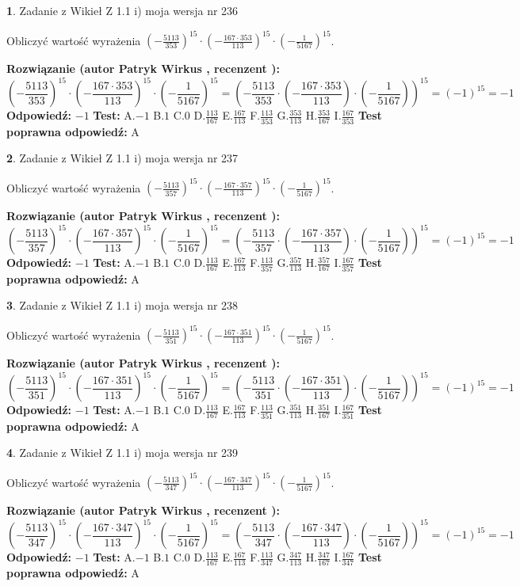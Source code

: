 \documentclass[12pt, a4paper]{article}
\theoremstyle{definition} %
\newtheorem{zad}{}
\newcommand{\zadStart}[1]{\begin{zad}#1\newline}
\newcommand{\zadStop}{\end{zad}}
\newcommand{\rozwStart}[2]{\noindent \textbf{Rozwiązanie (autor #1 , recenzent #2): }\newline}
\newcommand{\rozwStop}{\newline}
\newcommand{\odpStart}{\noindent \textbf{Odpowiedź:}\newline}
\newcommand{\odpStop}{\newline}
\newcommand{\testStart}{\noindent \textbf{Test:}\newline}
\newcommand{\testStop}{\newline}
\newcommand{\kluczStart}{\noindent \textbf{Test poprawna odpowiedź:}\newline}
\newcommand{\kluczStop}{\newline}
\begin{document}
\zadStart{Zadanie z Wikieł Z 1.1 i) moja wersja nr 236}

Obliczyć wartość wyrażenia $(-\frac{5113}{353})^{15} \cdot (-\frac{167 \cdot 353}{113})^{15} \cdot (-\frac{1}{5167})^{15}$.
\zadStop
\rozwStart{Patryk Wirkus}{}
$$(-\frac{5113}{353})^{15} \cdot (-\frac{167 \cdot 353}{113})^{15} \cdot (-\frac{1}{5167})^{15} = (-\frac{5113}{353} \cdot (-\frac{167 \cdot 353}{113}) \cdot (-\frac{1}{5167}))^{15} = (-1)^{15} = -1$$
\rozwStop
\odpStart
$-1$
\odpStop
\testStart
A.$-1$ B.$1$ C.$0$ D.$\frac{113}{167}$ E.$\frac{167}{113}$
F.$\frac{113}{353}$ G.$\frac{353}{113}$
H.$\frac{353}{167}$
I.$\frac{167}{353}$
\testStop
\kluczStart
A
\kluczStop



\zadStart{Zadanie z Wikieł Z 1.1 i) moja wersja nr 237}

Obliczyć wartość wyrażenia $(-\frac{5113}{357})^{15} \cdot (-\frac{167 \cdot 357}{113})^{15} \cdot (-\frac{1}{5167})^{15}$.
\zadStop
\rozwStart{Patryk Wirkus}{}
$$(-\frac{5113}{357})^{15} \cdot (-\frac{167 \cdot 357}{113})^{15} \cdot (-\frac{1}{5167})^{15} = (-\frac{5113}{357} \cdot (-\frac{167 \cdot 357}{113}) \cdot (-\frac{1}{5167}))^{15} = (-1)^{15} = -1$$
\rozwStop
\odpStart
$-1$
\odpStop
\testStart
A.$-1$ B.$1$ C.$0$ D.$\frac{113}{167}$ E.$\frac{167}{113}$
F.$\frac{113}{357}$ G.$\frac{357}{113}$
H.$\frac{357}{167}$
I.$\frac{167}{357}$
\testStop
\kluczStart
A
\kluczStop



\zadStart{Zadanie z Wikieł Z 1.1 i) moja wersja nr 238}

Obliczyć wartość wyrażenia $(-\frac{5113}{351})^{15} \cdot (-\frac{167 \cdot 351}{113})^{15} \cdot (-\frac{1}{5167})^{15}$.
\zadStop
\rozwStart{Patryk Wirkus}{}
$$(-\frac{5113}{351})^{15} \cdot (-\frac{167 \cdot 351}{113})^{15} \cdot (-\frac{1}{5167})^{15} = (-\frac{5113}{351} \cdot (-\frac{167 \cdot 351}{113}) \cdot (-\frac{1}{5167}))^{15} = (-1)^{15} = -1$$
\rozwStop
\odpStart
$-1$
\odpStop
\testStart
A.$-1$ B.$1$ C.$0$ D.$\frac{113}{167}$ E.$\frac{167}{113}$
F.$\frac{113}{351}$ G.$\frac{351}{113}$
H.$\frac{351}{167}$
I.$\frac{167}{351}$
\testStop
\kluczStart
A
\kluczStop



\zadStart{Zadanie z Wikieł Z 1.1 i) moja wersja nr 239}

Obliczyć wartość wyrażenia $(-\frac{5113}{347})^{15} \cdot (-\frac{167 \cdot 347}{113})^{15} \cdot (-\frac{1}{5167})^{15}$.
\zadStop
\rozwStart{Patryk Wirkus}{}
$$(-\frac{5113}{347})^{15} \cdot (-\frac{167 \cdot 347}{113})^{15} \cdot (-\frac{1}{5167})^{15} = (-\frac{5113}{347} \cdot (-\frac{167 \cdot 347}{113}) \cdot (-\frac{1}{5167}))^{15} = (-1)^{15} = -1$$
\rozwStop
\odpStart
$-1$
\odpStop
\testStart
A.$-1$ B.$1$ C.$0$ D.$\frac{113}{167}$ E.$\frac{167}{113}$
F.$\frac{113}{347}$ G.$\frac{347}{113}$
H.$\frac{347}{167}$
I.$\frac{167}{347}$
\testStop
\kluczStart
A
\kluczStop
\end{document}
